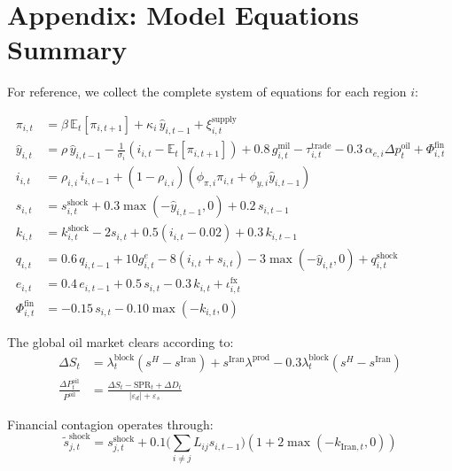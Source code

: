 \documentclass[12pt,a4paper]{article}
\begin{document}

\newpage
\appendix
\section*{Appendix: Model Equations Summary}

For reference, we collect the complete system of equations for each region $i$:

\begin{align}
\pi_{i,t} &= \beta \, \mathbb{E}_t[\pi_{i,t+1}] + \kappa_i \, \hat{y}_{i,t-1} + \xi^{\text{supply}}_{i,t} \tag{A.1} \\[6pt]
\hat{y}_{i,t} &= \rho \, \hat{y}_{i,t-1} - \frac{1}{\sigma_i}(i_{i,t} - \mathbb{E}_t[\pi_{i,t+1}]) + 0.8 \, g^{\text{mil}}_{i,t} - \tau^{\text{trade}}_{i,t} - 0.3 \, \alpha_{e,i} \Delta p^{\text{oil}}_t + \Phi^{\text{fin}}_{i,t} \tag{A.2} \\[6pt]
i_{i,t} &= \rho_{i,i} \, i_{i,t-1} + (1-\rho_{i,i})(\phi_{\pi,i} \pi_{i,t} + \phi_{y,i} \hat{y}_{i,t-1}) \tag{A.3} \\[6pt]
s_{i,t} &= s^{\text{shock}}_{i,t} + 0.3 \max(-\hat{y}_{i,t-1}, 0) + 0.2 \, s_{i,t-1} \tag{A.4} \\[6pt]
k_{i,t} &= k^{\text{shock}}_{i,t} - 2 s_{i,t} + 0.5(i_{i,t} - 0.02) + 0.3 \, k_{i,t-1} \tag{A.5} \\[6pt]
q_{i,t} &= 0.6 \, q_{i,t-1} + 10 g^e_{i,t} - 8(i_{i,t} + s_{i,t}) - 3 \max(-\hat{y}_{i,t},0) + q^{\text{shock}}_{i,t} \tag{A.6} \\[6pt]
e_{i,t} &= 0.4 \, e_{i,t-1} + 0.5 \, s_{i,t} - 0.3 \, k_{i,t} + \iota^{\text{fx}}_{i,t} \tag{A.7} \\[6pt]
\Phi^{\text{fin}}_{i,t} &= -0.15 \, s_{i,t} - 0.10 \max(-k_{i,t}, 0) \tag{A.8}
\end{align}

The global oil market clears according to:
\begin{align}
\Delta S_t &= \lambda^{\text{block}}_t (s^H - s^{\text{Iran}}) + s^{\text{Iran}} \lambda^{\text{prod}} - 0.3 \lambda^{\text{block}}_t (s^H - s^{\text{Iran}}) \tag{A.9} \\[6pt]
\frac{\Delta P^{\text{oil}}_t}{P^{\text{oil}}} &= \frac{\Delta S_t - \text{SPR}_t + \Delta D_t}{|\varepsilon_d| + \varepsilon_s} \tag{A.10}
\end{align}

Financial contagion operates through:
\begin{equation}
\tilde{s}^{\text{shock}}_{j,t} = s^{\text{shock}}_{j,t} + 0.1 \Big(\textstyle\sum_{i \neq j} L_{ij} s_{i,t-1}\Big)(1 + 2\max(-k_{\text{Iran},t}, 0)) \tag{A.11}
\end{equation}
\end{document}
